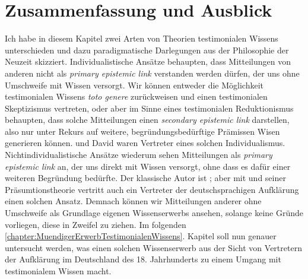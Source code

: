 \section{Zusammenfassung und Ausblick}
Ich habe in diesem Kapitel zwei Arten von Theorien testimonialen Wissens
unterschieden und dazu paradigmatische Darlegungen aus der Philosophie der
Neuzeit skizziert. Individualistische Ansätze behaupten, dass Mitteilungen von
anderen nicht als \emph{primary epistemic link} verstanden werden dürfen, der
uns ohne Umschweife mit Wissen versorgt. Wir können entweder die Möglichkeit
testimonialen Wissens \emph{toto genere} zurückweisen und einen testimonialen
Skeptizismus vertreten, oder aber im Sinne eines testimonialen Reduktionismus
behaupten, dass solche Mitteilungen einen \emph{secondary epistemic link}
darstellen, also nur unter Rekurs auf weitere, begründungsbedürftige Prämissen
Wisen generieren können.  und
David  waren Vertreter eines solchen Individualismus.
Nichtindividualistische Ansätze wiederum sehen Mitteilungen als \emph{primary
epistemic link} an, der uns direkt mit Wissen versorgt, ohne dass es dafür einer
weiteren Begründung bedürfte. Der klassische Autor ist
; aber mit
und seiner Präsumtionstheorie vertritt  auch ein Vertreter der deutschsprachigen
Aufklärung einen solchen Ansatz. Demnach können wir Mitteilungen anderer ohne
Umschweife als Grundlage eigenen Wissenserwerbs ansehen, solange keine Gründe
vorliegen, diese in Zweifel zu ziehen. Im folgenden
\ref{chapter:MuendigerErwerbTestimonialenWissens}. Kapitel soll nun genauer
untersucht werden, was einen solchen Wissenserwerb aus der Sicht von Vertretern
der Aufklärung im Deutschland des 18. Jahrhunderts zu einem
 Umgang mit testimonialem Wissen macht.

